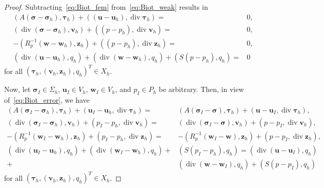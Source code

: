 \documentclass[10pt,a4paper]{amsart}
\def\bu{{\boldsymbol u}}
\def\bv{{\boldsymbol v}}
\def\bw{{\boldsymbol w}}
\def\bz{\boldsymbol z}
\renewcommand{\div}{\operatorname{div}}
\def\sig{{\bm \sigma}}
\begin{document}
\begin{proof}
Subtracting~\eqref{eq:Biot_fem} from~\eqref{eq:Biot_weak} results in
%
\begin{subequations}\label{eq:Biot_error}
\begin{align}   
(A (\sig-\sig_h), \bm \tau_h) + ((\bu-\bu_h),\div \bm \tau_h) = &  0, \label{eq:Biot_error1}\\
%
(\div (\sig-\sig_h),\bv_h) + ((p-p_h), \div \bv_h) = & 0,  \label{eq:Biot_error2}\\  
%
- (R_p^{-1}  (\bw-\bw_h), \bz_h) + ((p-p_h),\div \bz_h) = &  0, \label{eq:Biot_error3} \\ 
%
(\div (\bu-\bu_h), q_h) + (\div (\bw-\bw_h), q_h) + (S (p-p_h),q_h) = & 0  \label{eq:Biot_error4} 
\end{align}
\end{subequations}
for all $(\bm \tau_h,(\bv_h,\bz_h),q_h)^T \in X_h$.

Now, let $\sig_I \in \Sigma_h$, $\bu_I \in V_h$, $\bw_I \in V_h$, and $p_I \in P_h$ be arbitrary. Then, in view of~\eqref{eq:Biot_error}, we have
%
\begin{subequations}\label{eq:Biot_error_est}
\begin{align}   
(A (\sig_I-\sig_h), \bm \tau_h) + (\bu_I-\bu_h,\div \bm \tau_h) = &  (A (\sig_I-\sig), \bm \tau_h) + (\bu-\bu_I,\div \bm \tau_h), \label{eq:Biot_error_est1}\\
%
(\div (\sig_I-\sig_h),\bv_h) + (p_I-p_h, \div \bv_h) = & (\div (\sig_I-\sig),\bv_h) + (p-p_I, \div \bv_h),  \label{eq:Biot_error_est2}\\  
%
- (R_p^{-1}  (\bw_I-\bw_h), \bz_h) + (p_I-p_h,\div \bz_h) = &  - (R_p^{-1}  (\bw_I-\bw), \bz_h) + (p-p_I,\div \bz_h), \label{eq:Biot_error_est3} \\ 
%
(\div (\bu_I-\bu_h), q_h) + (\div (\bw_I-\bw_h), q_h) + & (S (p_I-p_h),q_h) 
=  (\div (\bu-\bu_I), q_h) \nonumber \\
+ & (\div (\bw -\bw_I), q_h) + (S (p-p_I),q_h)  \label{eq:Biot_error_est4} 
\end{align}
\end{subequations}
for all $(\bm \tau_h,(\bv_h,\bz_h),q_h)^T \in X_h$.


\end{proof}
\end{document}
